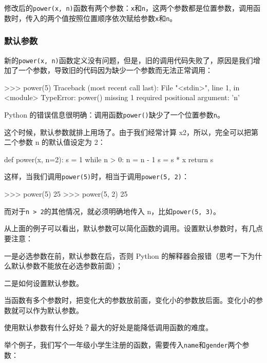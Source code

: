修改后的\texttt{power(x,\ n)}函数有两个参数：\texttt{x}和\texttt{n}，这两个参数都是位置参数，调用函数时，传入的两个值按照位置顺序依次赋给参数\texttt{x}和\texttt{n}。

\hypertarget{ux9ed8ux8ba4ux53c2ux6570}{%
\subsubsection{默认参数}\label{ux9ed8ux8ba4ux53c2ux6570}}

新的\texttt{power(x,\ n)}函数定义没有问题，但是，旧的调用代码失败了，原因是我们增加了一个参数，导致旧的代码因为缺少一个参数而无法正常调用：

\begin{pythoncode}
>>> power(5)
Traceback (most recent call last):
  File "<stdin>", line 1, in <module>
TypeError: power() missing 1 required positional argument: 'n'
\end{pythoncode}

Python
的错误信息很明确：调用函数\texttt{power()}缺少了一个位置参数\texttt{n}。

这个时候，默认参数就排上用场了。由于我们经常计算
x2，所以，完全可以把第二个参数 n 的默认值设定为 2：

\begin{pythoncode}
def power(x, n=2):
    s = 1
    while n > 0:
        n = n - 1
        s = s * x
    return s
\end{pythoncode}

这样，当我们调用\texttt{power(5)}时，相当于调用\texttt{power(5,\ 2)}：

\begin{pythoncode}
>>> power(5)
25
>>> power(5, 2)
25
\end{pythoncode}

而对于\texttt{n\ \textgreater{}\ 2}的其他情况，就必须明确地传入
n，比如\texttt{power(5,\ 3)}。

从上面的例子可以看出，默认参数可以简化函数的调用。设置默认参数时，有几点要注意：

一是必选参数在前，默认参数在后，否则 Python
的解释器会报错（思考一下为什么默认参数不能放在必选参数前面）；

二是如何设置默认参数。

当函数有多个参数时，把变化大的参数放前面，变化小的参数放后面。变化小的参数就可以作为默认参数。

使用默认参数有什么好处？最大的好处是能降低调用函数的难度。

举个例子，我们写个一年级小学生注册的函数，需要传入\texttt{name}和\texttt{gender}两个参数：

